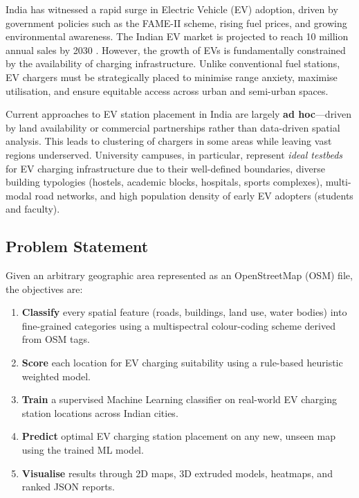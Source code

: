 \documentclass[12pt, a4paper]{article}
\begin{document}
India has witnessed a rapid surge in Electric Vehicle (EV) adoption, 
driven by government policies such as the FAME-II scheme, rising fuel 
prices, and growing environmental awareness. The Indian EV market is 
projected to reach 10 million annual sales by 2030 \cite{niti2022}. 
However, the growth of EVs is fundamentally constrained by the 
availability of charging infrastructure. Unlike conventional fuel 
stations, EV chargers must be strategically placed to minimise range 
anxiety, maximise utilisation, and ensure equitable access across 
urban and semi-urban spaces.

Current approaches to EV station placement in India are largely 
\textbf{ad hoc}---driven by land availability or commercial 
partnerships rather than data-driven spatial analysis. This leads to 
clustering of chargers in some areas while leaving vast regions 
underserved. University campuses, in particular, represent 
\textit{ideal testbeds} for EV charging infrastructure due to their 
well-defined boundaries, diverse building typologies (hostels, 
academic blocks, hospitals, sports complexes), multi-modal road 
networks, and high population density of early EV adopters (students 
and faculty).

\subsection{Problem Statement}

Given an arbitrary geographic area represented as an OpenStreetMap 
(OSM) file, the objectives are:

\begin{enumerate}[label=(\roman*)]
    \item \textbf{Classify} every spatial feature (roads, buildings, 
    land use, water bodies) into fine-grained categories using a 
    multispectral colour-coding scheme derived from OSM tags.
    \item \textbf{Score} each location for EV charging suitability 
    using a rule-based heuristic weighted model.
    \item \textbf{Train} a supervised Machine Learning classifier on 
    real-world EV charging station locations across Indian cities.
    \item \textbf{Predict} optimal EV charging station placement on 
    any new, unseen map using the trained ML model.
    \item \textbf{Visualise} results through 2D maps, 3D extruded 
    models, heatmaps, and ranked JSON reports.
\end{enumerate}
\end{document}
